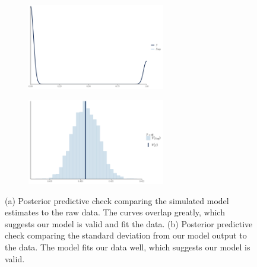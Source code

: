 \documentclass{article}\usepackage[]{graphicx}\usepackage[]{color}
\begin{document}
{\begin{figure} [H]
\begin{subfigure}{.5\textwidth}
  \centering
  \includegraphics[width=6cm]{..//figures/PPCs/orig_ppc.png}
  \caption{}
  \label{fig:sfig1}
\end{subfigure}%
\begin{subfigure}{.5\textwidth}
  \centering
  \includegraphics[width=6cm]{..//figures/PPCs/ppc_sd.png}
  \caption{}
  \label{fig:sfig2}
\end{subfigure}
\caption{(a) Posterior predictive check comparing the simulated model estimates to the raw data. The curves overlap greatly, which suggests our model is valid and fit the data. (b) Posterior predictive check comparing the standard deviation from our model output to the data. The model fits our data well, which suggests our model is valid.} %
\label{fig:suppppc}
\end{figure}}
\end{document}
